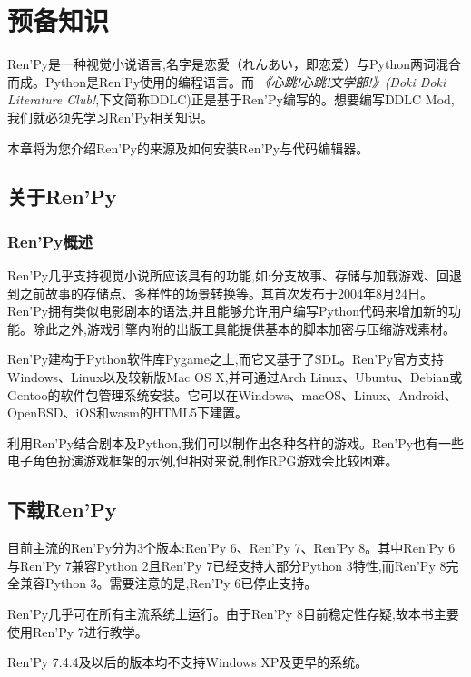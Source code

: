 \documentclass[../../Main.tex]{subfiles}
\begin{document}
\chapter{预备知识}
Ren'Py是一种视觉小说语言,名字是恋愛（れんあい，即恋爱）与Python两词混合而成。Python是Ren'Py使用的编程语言。而 \textit{《心跳!心跳!文学部!》(Doki Doki Literature Club!},下文简称DDLC)正是基于Ren'Py编写的。想要编写DDLC Mod,我们就必须先学习Ren'Py相关知识。

本章将为您介绍Ren'Py的来源及如何安装Ren'Py与代码编辑器。

\section{关于Ren'Py}
\subsection{Ren'Py概述}
Ren'Py几乎支持视觉小说所应该具有的功能,如:分支故事、存储与加载游戏、回退到之前故事的存储点、多样性的场景转换等。其首次发布于2004年8月24日。Ren'Py拥有类似电影剧本的语法,并且能够允许用户编写Python代码来增加新的功能。除此之外,游戏引擎内附的出版工具能提供基本的脚本加密与压缩游戏素材。

Ren'Py建构于Python软件库Pygame之上,而它又基于了SDL。Ren'Py官方支持Windows、Linux以及较新版Mac OS X,并可通过Arch Linux、Ubuntu、Debian或Gentoo的软件包管理系统安装。它可以在Windows、macOS、Linux、Android、OpenBSD、iOS和wasm的HTML5下建置。

利用Ren'Py结合剧本及Python,我们可以制作出各种各样的游戏。Ren'Py也有一些电子角色扮演游戏框架的示例,但相对来说,制作RPG游戏会比较困难。

\section{下载Ren'Py}
\label{1.2}
目前主流的Ren'Py分为3个版本:Ren'Py 6、Ren'Py 7、Ren'Py 8。其中Ren'Py 6与Ren'Py 7兼容Python 2且Ren'Py 7已经支持大部分Python 3特性,而Ren'Py 8完全兼容Python 3。需要注意的是,Ren'Py 6已停止支持。

Ren'Py几乎可在所有主流系统上运行。由于Ren'Py 8目前稳定性存疑,故本书主要使用Ren'Py 7进行教学。

\begin{Comment}
Ren'Py 7.4.4及以后的版本均不支持Windows XP及更早的系统。
\end{Comment}
\end{document}
